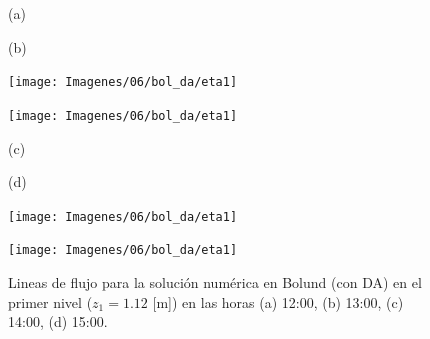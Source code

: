 \begin{figure}[H]
	\begin{minipage}{0.5\linewidth}
		\centering
		\hspace{1cm}(a)
	\end{minipage}%
	\begin{minipage}{0.5\linewidth}
		\centering
		\hspace{-1cm}(b)
	\end{minipage}%
	
	\begin{minipage}{0.5\linewidth}
		\centering
		\texttt{[image: Imagenes/06/bol\_da/eta1]}%
	\end{minipage}%
	\begin{minipage}{0.5\linewidth}
		\centering
		\texttt{[image: Imagenes/06/bol\_da/eta1]}%
	\end{minipage}%
	\vspace{1mm}
	
	\begin{minipage}{0.5\linewidth}
		\centering
		\hspace{1cm}(c)
	\end{minipage}%
	\begin{minipage}{0.5\linewidth}
		\centering
		\hspace{-1cm}(d)
	\end{minipage}%
	
	\begin{minipage}{0.5\linewidth}
		\centering
		\texttt{[image: Imagenes/06/bol\_da/eta1]}%
	\end{minipage}%
	\begin{minipage}{0.5\linewidth}
		\centering
		\texttt{[image: Imagenes/06/bol\_da/eta1]}%
	\end{minipage}%
	\caption{Lineas de flujo para la solución numérica en Bolund (con DA) en el primer nivel ($z_1 = 1.12$ [m]) en las horas (a) 12:00, (b) 13:00, (c) 14:00, (d) 15:00.}
	\label{fig:06_bol_da_st}
\end{figure}

